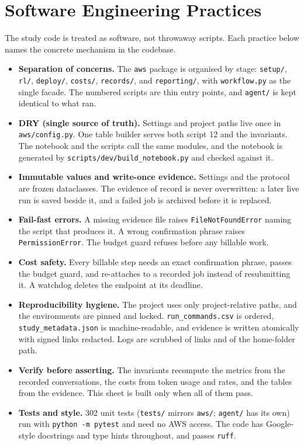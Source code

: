 \documentclass[11pt]{article}
\begin{document}
\section{Software Engineering Practices}
The study code is treated as software, not throwaway scripts. Each practice below names the concrete
mechanism in the codebase.
\begin{itemize}[leftmargin=*]
\item \textbf{Separation of concerns.} The \texttt{aws} package is organised by stage: \texttt{setup/},
\texttt{rl/}, \texttt{deploy/}, \texttt{costs/}, \texttt{records/}, and \texttt{reporting/}, with
\texttt{workflow.py} as the single facade. The numbered scripts are thin entry points, and \texttt{agent/} is
kept identical to what ran.
\item \textbf{DRY (single source of truth).} Settings and project paths live once in \texttt{aws/config.py}.
One table builder serves both script 12 and the invariants. The notebook and the scripts call the same
modules, and the notebook is generated by \texttt{scripts/dev/build\_notebook.py} and checked against it.
\item \textbf{Immutable values and write-once evidence.} Settings and the protocol are frozen dataclasses.
The evidence of record is never overwritten: a later live run is saved beside it, and a failed job is
archived before it is replaced.
\item \textbf{Fail-fast errors.} A missing evidence file raises \texttt{FileNotFoundError} naming the script
that produces it. A wrong confirmation phrase raises \texttt{PermissionError}. The budget guard refuses before
any billable work.
\item \textbf{Cost safety.} Every billable step needs an exact confirmation phrase, passes the budget guard,
and re-attaches to a recorded job instead of resubmitting it. A watchdog deletes the endpoint at its
deadline.
\item \textbf{Reproducibility hygiene.} The project uses only project-relative paths, and the environments
are pinned and locked. \texttt{run\_commands.csv} is ordered, \texttt{study\_metadata.json} is
machine-readable, and evidence is written atomically with signed links redacted. Logs are scrubbed of links
and of the home-folder path.
\item \textbf{Verify before asserting.} The invariants recompute the metrics from the recorded conversations,
the costs from token usage and rates, and the tables from the evidence. This sheet is built only when all of
them pass.
\item \textbf{Tests and style.} 302 unit tests (\texttt{tests/} mirrors \texttt{aws/};
\texttt{agent/} has its own) run with \texttt{python -m pytest} and need no AWS access. The code has
Google-style docstrings and type hints throughout, and passes \texttt{ruff}.
\end{itemize}
\end{document}
